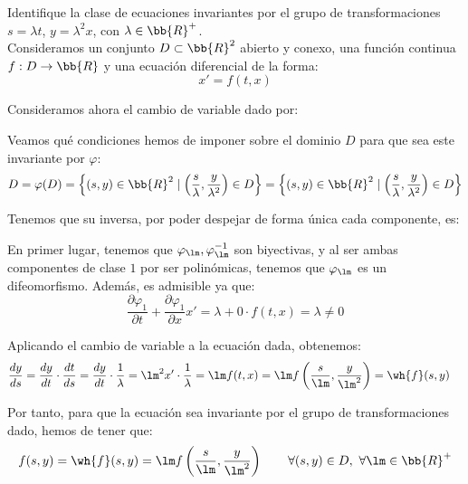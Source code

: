 \begin{ejercicio}
    Identifique la clase de ecuaciones invariantes por el grupo de transformaciones $s = \lambda t$, $y = \lambda^2 x$, con $\lambda\in \bb{R}^+$.\\

    Consideramos un conjunto $D\subset \bb{R}^2$ abierto y conexo, una función continua $f:D\to \bb{R}$ y una ecuación diferencial de la forma:
    \begin{equation*}
        x' = f(t, x)
    \end{equation*}

    Consideramos ahora el cambio de variable dado por:

    Veamos qué condiciones hemos de imponer sobre el dominio $D$ para que sea este invariante por $\varphi$:
    \begin{equation*}
        D=\varphi(D) = \left\{(s,y)\in \bb{R}^2 \mid \left(\dfrac{s}{\lambda}, \dfrac{y}{\lambda^2}\right)\in D\right\} = \left\{(s,y)\in \bb{R}^2 \mid \left(\dfrac{s}{\lambda}, \dfrac{y}{\lambda^2}\right)\in D\right\}
    \end{equation*}

    Tenemos que su inversa, por poder despejar de forma única cada componente, es:

    En primer lugar, tenemos que $\varphi_\lm,\varphi_\lm^{-1}$ son biyectivas, y al ser ambas componentes de clase $1$ por ser polinómicas, tenemos que $\varphi_\lm$ es un difeomorfismo. Además, es admisible ya que:
    \begin{equation*}
        \dfrac{\partial \varphi_1}{\partial t} + \dfrac{\partial \varphi_1}{\partial x}x' = \lambda + 0\cdot f(t,x) = \lambda\neq 0
    \end{equation*}

    Aplicando el cambio de variable a la ecuación dada, obtenemos:
    \begin{align*}
        \dfrac{dy}{ds} &= \dfrac{dy}{dt}\cdot \dfrac{dt}{ds} = \dfrac{dy}{dt}\cdot \dfrac{1}{\lambda} = \lm^2x'\cdot \dfrac{1}{\lambda} = \lm f(t,x) = \lm f\left(\dfrac{s}{\lm}, \dfrac{y}{\lm^2}\right) = \wh{f}(s,y)
    \end{align*}

    Por tanto, para que la ecuación sea invariante por el grupo de transformaciones dado, hemos de tener que:
    \begin{equation*}
        f(s,y) = \wh{f}(s,y) = \lm f\left(\dfrac{s}{\lm}, \dfrac{y}{\lm^2}\right) \qquad \forall(s,y)\in D,~\forall \lm\in \bb{R}^+
    \end{equation*}
\end{ejercicio}

